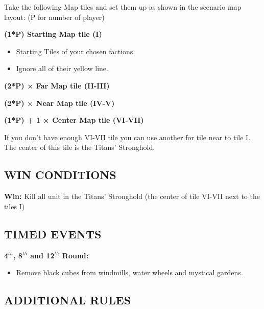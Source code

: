 \begin{multicols*}{2}
Take the following Map tiles and set them up as shown in the scenario map layout: (P for number of player)

\textbf{(1*P) Starting Map tile (I)}
\begin{itemize}
    \item Starting Tiles of your chosen factions.
    \item Ignore all of their yellow line.
\end{itemize}

\textbf{(2*P) × Far Map tile (II-III)}

\textbf{(2*P) × Near Map tile (IV-V)}

\textbf{(1*P) + 1 × Center Map tile (VI-VII)}

If you don't have enough VI-VII tile you can use another for tile near to tile I.
The center of this tile is the Titans' Stronghold.

\subsection*{\MakeUppercase{Win conditions}}

\textbf{Win:} Kill all unit in the Titans' Stronghold (the center of tile VI-VII next to the tiles I)

\subsection*{\MakeUppercase{Timed events}}

\textbf{4$^{th}$, 8$^{th}$ and 12$^{th}$ Round:}
\begin{itemize}
    \item Remove black cubes from windmills, water wheels and mystical gardens.
\end{itemize}

\end{multicols*}

\newpage

\subsection*{\MakeUppercase{Additional rules}}

